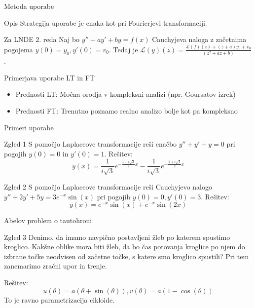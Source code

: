 \documentclass[t, 8pt]{beamer} %
\begin{document}
		\begin{frame}{Metoda uporabe}
			\begin{block}{Opis}
				Strategija uporabe je enaka kot pri Fourierjevi transformaciji.
			\end{block}
			\begin{block}{Za LNDE $2.$ reda}
				Naj bo $y'' + ay' + by = f(x)$ Cauchyjeva naloga z začetnima pogojema $y(0) = y_0, y'(0) = v_0$. Tedaj je $\mathcal{L}(y)(z)= \frac{\mathcal{L}(f)(z) +(z+a)y_0 + v_0}{(z^2 + az + b)}$.
			\end{block}
			\begin{block}{Primerjava uporabe LT in FT}
				\begin{itemize}
					\item Prednosti LT: Močna orodja v kompleksni analizi (npr. Goursatov izrek)
					\item Prednosti FT: Trenutno poznamo realno analizo bolje kot pa kompleksno
				\end{itemize}
			\end{block}
		\end{frame}
		
		\begin{frame}{Primeri uporabe}
			\begin{block}{Zgled 1}
				S pomočjo Laplaceove transformacije reši enačbo $y'' + y' + y = 0$ pri pogojih $y(0) = 0$ in $y'(0) = 1$.
				Rešitev: $$y(x) = \frac{1}{i\sqrt{3}}e^{-\frac{1 - i\sqrt{3}}{2}x}-\frac{1}{i\sqrt{3}}e^{-\frac{1 + i\sqrt{3}}{2}x}$$
			\end{block}
			\begin{block}{Zgled 2}
				S pomočjo Laplaceove transformacije reši Cauchyjevo nalogo $y'' + 2y' + 5y = 3e^{-x}\sin(x)$ pri pogojih $y(0) = 0, y'(0)=3$. Rešitev: $$y(x) = e^{-x}\sin(x) + e^{-x}\sin(2x)$$
			\end{block}
		\end{frame}
		
		\begin{frame}{Abelov problem o tautohroni}
			\begin{block}{Zgled 3}
					Denimo, da imamo navpično postavljeni žleb po katerem spustimo kroglico. Kakšne oblike mora biti žleb, da bo čas potovanja kroglice po njem do izbrane točke neodvisen od začetne točke, s katere smo kroglico spustili? Pri tem zanemarimo zračni upor in trenje.
					
					Rešitev: $$u(\theta)= a(\theta + \sin(\theta)), v(\theta) = a(1-\cos(\theta))$$ To je ravno parametrizacija cikloide.
			\end{block}
		\end{frame}
		
\end{document}
